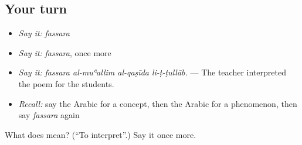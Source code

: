 \subsection*{Your turn}
\begin{itemize}
\raggedright
  \item \emph{Say it:} \emph{fassara}
  \item \emph{Say it:} \emph{fassara}, once more
  \item \emph{Say it:} \emph{fassara al-muʿallim al-qaṣīda li-ṭ-ṭullāb.} — The teacher interpreted the poem for the students.
  \item \emph{Recall:} say the Arabic for a concept, then the Arabic for a phenomenon, then say \emph{fassara} again
\end{itemize}

\begin{tcolorbox}[breakable,colback=teal!4,colframe=teal!35!black,title={Before you move on}]
What does  mean? (\textquotedblleft{}To interpret\textquotedblright{}.) Say it once more.
\end{tcolorbox}
